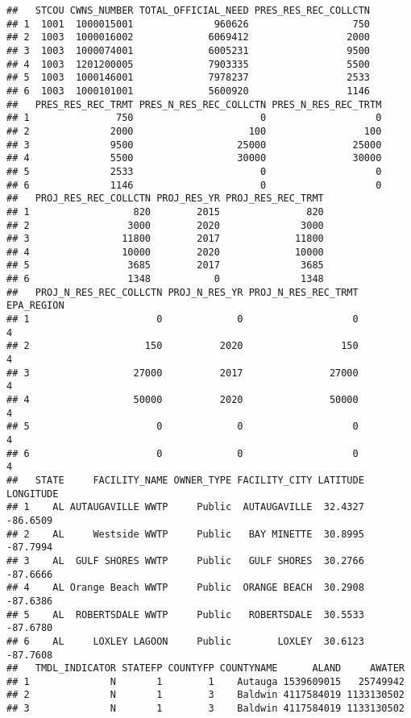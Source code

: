 \documentclass[]{article}
\begin{document}
\begin{verbatim}
##   STCOU CWNS_NUMBER TOTAL_OFFICIAL_NEED PRES_RES_REC_COLLCTN
## 1  1001  1000015001              960626                  750
## 2  1003  1000016002             6069412                 2000
## 3  1003  1000074001             6005231                 9500
## 4  1003  1201200005             7903335                 5500
## 5  1003  1000146001             7978237                 2533
## 6  1003  1000101001             5600920                 1146
##   PRES_RES_REC_TRMT PRES_N_RES_REC_COLLCTN PRES_N_RES_REC_TRTM
## 1               750                      0                   0
## 2              2000                    100                 100
## 3              9500                  25000               25000
## 4              5500                  30000               30000
## 5              2533                      0                   0
## 6              1146                      0                   0
##   PROJ_RES_REC_COLLCTN PROJ_RES_YR PROJ_RES_REC_TRMT
## 1                  820        2015               820
## 2                 3000        2020              3000
## 3                11800        2017             11800
## 4                10000        2020             10000
## 5                 3685        2017              3685
## 6                 1348           0              1348
##   PROJ_N_RES_REC_COLLCTN PROJ_N_RES_YR PROJ_N_RES_REC_TRMT EPA_REGION
## 1                      0             0                   0          4
## 2                    150          2020                 150          4
## 3                  27000          2017               27000          4
## 4                  50000          2020               50000          4
## 5                      0             0                   0          4
## 6                      0             0                   0          4
##   STATE     FACILITY_NAME OWNER_TYPE FACILITY_CITY LATITUDE LONGITUDE
## 1    AL AUTAUGAVILLE WWTP     Public  AUTAUGAVILLE  32.4327  -86.6509
## 2    AL     Westside WWTP     Public   BAY MINETTE  30.8995  -87.7994
## 3    AL  GULF SHORES WWTP     Public   GULF SHORES  30.2766  -87.6666
## 4    AL Orange Beach WWTP     Public  ORANGE BEACH  30.2908  -87.6386
## 5    AL  ROBERTSDALE WWTP     Public   ROBERTSDALE  30.5533  -87.6780
## 6    AL     LOXLEY LAGOON     Public        LOXLEY  30.6123  -87.7608
##   TMDL_INDICATOR STATEFP COUNTYFP COUNTYNAME      ALAND     AWATER
## 1              N       1        1    Autauga 1539609015   25749942
## 2              N       1        3    Baldwin 4117584019 1133130502
## 3              N       1        3    Baldwin 4117584019 1133130502

\end{verbatim}
\end{document}
